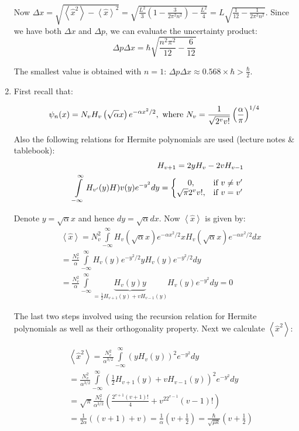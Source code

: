 \begin{enumerate}
Now $\Delta x = \sqrt{\left<\hat{x}^2\right> - \left<\hat{x}\right>^2} = \sqrt{\frac{L^2}{3}\left(1 - \frac{3}{2\pi^2n^2}\right) - \frac{L^2}{4}} = L\sqrt{\frac{1}{12} - \frac{1}{2\pi^2n^2}}$. Since we have both $\Delta x$ and $\Delta p$, we can evaluate the uncertainty product:
$$\Delta p\Delta x = \hbar\sqrt{\frac{n^2\pi^2}{12} - \frac{6}{12}}$$

The smallest value is obtained with $n = 1$: $\Delta p\Delta x\approx 0.568\times\hbar > \frac{\hbar}{2}$.

\item First recall that:

$$\psi_n(x) = N_vH_v\left(\sqrt{\alpha}x\right)e^{-\alpha x^2/2},\textnormal{ where }N_v=\frac{1}{\sqrt{2^vv!}}\left(\frac{\alpha}{\pi}\right)^{1/4}$$

Also the following relations for Hermite polynomials are used (lecture notes \& tablebook):
\begin{eqnarray}
\nonumber
 & & H_{v+1} = 2yH_v - 2vH_{v-1}\\
\nonumber
 & & \int\limits_{-\infty}^{\infty}H_{v'}(y)H)v(y)e^{-y^2}dy = \left\lbrace\begin{matrix}0, & \textnormal{if }v\ne v'\\
\sqrt{\pi}2^vv!, & \textnormal{if }v = v'\end{matrix}\right.
\end{eqnarray}

Denote $y = \sqrt{\alpha}x$ and hence $dy = \sqrt{\alpha}dx$. Now $\left<\hat{x}\right>$ is given by:
\begin{eqnarray}
\nonumber
& & \left<\hat{x}\right> = N_v^2\int\limits_{-\infty}^{\infty}H_v\left(\sqrt{\alpha}x\right)e^{-\alpha x^2/2}xH_v\left(\sqrt{\alpha}x\right)e^{-\alpha x^2/2}dx\\
\nonumber
& & = \frac{N_v^2}{\alpha}\int\limits_{-\infty}^{\infty}H_v(y)e^{-y^2/2}yH_v(y)e^{-y^2/2}dy\\
\nonumber
& & = \frac{N_v^2}{\alpha}\int\limits_{-\infty}^{\infty}\underbrace{H_v(y)y}_{=\frac{1}{2}H_{v+1}(y) + vH_{v-1}(y)}H_v(y)e^{-y^2}dy = 0
\end{eqnarray}

The last two steps involved using the recursion relation for Hermite polynomials as well as their orthogonality property. Next we calculate $\left<\hat{x}^2\right>$:

\begin{eqnarray}
\nonumber
& & \left<\hat{x}^2\right> = \frac{N_v^2}{\alpha^{3/2}}\int\limits_{-\infty}^{\infty}\left(yH_v(y)\right)^2e^{-y^2}dy\\
\nonumber
& & = \frac{N_v^2}{\alpha^{3/2}}\int\limits_{-\infty}^{\infty}\left(\frac{1}{2}H_{v+1}(y) + vH_{v-1}(y)\right)^2e^{-y^2}dy\\
\nonumber
& & = \sqrt{\pi}\frac{N_v^2}{\alpha^{3/2}}\left(\frac{2^{v+1}(v+1)!}{4} + v^22^{v-1}(v - 1)!\right)\\
\nonumber
& & = \frac{1}{2\alpha}\left((v + 1) + v\right) = \frac{1}{\alpha}\left(v + \frac{1}{2}\right) = \frac{\hbar}{\sqrt{\mu k}}\left(v + \frac{1}{2}\right)
\end{eqnarray}


\end{enumerate}
